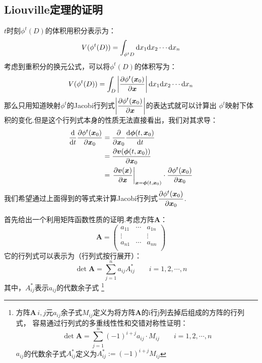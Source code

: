     \subsection{Liouville定理的证明}
    $t$时刻$\phi^t(D)$的体积用积分表示为：
    \begin{equation}
        V(\phi^t(D)) = \int_{\phi^t D}\mathrm{d} x_1\mathrm{d} x_2\cdots\mathrm{d} x_n
    \end{equation}
    考虑到重积分的换元公式，可以将$\phi^t(D)$的体积写为：
    \begin{equation}
        V(\phi^t(D)) = \int_{D}\left|\frac{\partial{\phi^t(\bm{x}_0)}}{\partial{\bm{x}}}\right|\mathrm{d} x_1\mathrm{d} x_2\cdots\mathrm{d} x_n
        \label{volum of D}
    \end{equation}
    那么只用知道映射$\phi^t$的Jacobi行列式$\displaystyle\left|\frac{\partial{\phi^t(\bm{x}_0)}}{\partial{\bm{x}}}\right|$的表达式就可以计算出
    $\phi^t$映射下体积的变化.但是这个行列式本身的性质无法直接看出，我们对其求导：
    \begin{equation}
        \begin{split}
            \frac{\mathrm{d}{}}{\mathrm{d}{t}}\frac{\partial{\phi^t(\bm{x}_0)}}{\partial{\bm{x}_0}} &= \frac{\partial{}}{\partial{\bm{x}_0}}\frac{\mathrm{d}{\bm{\phi}(t, \bm{x}_0)}}{\mathrm{d}{t}}\\
            & = \frac{\partial{\bm{v}(\bm{\phi}(t, \bm{x}_0))}}{\partial{\bm{x}_0}}\\
            & = \left.\frac{\partial{\bm{v}(\bm{x})}}{\partial{\bm{x}}}\right|_{\bm{x}=\bm{\phi}(t, \bm{x}_0)}\cdot
            \frac{\partial{\phi^t(\bm{x}_0)}}{\partial{\bm{x}_0}}
        \end{split}
        \label{the equation of jacobian}
    \end{equation}
    我们希望通过上面得到的等式来计算Jacobi行列式$\displaystyle\frac{\partial{\phi^t(\bm{x}_0)}}{\partial{\bm{x}_0}}$.
    \par 
    首先给出一个利用矩阵函数性质的证明.考虑方阵$\bm{A}$：
    \begin{equation}
        \bm{A} = 
        \begin{pmatrix}
            a_{11} & \cdots & a_{1n}\\
            \vdots & & \vdots\\
            a_{n1} & \cdots & a_{nn}\\
        \end{pmatrix}
    \end{equation}
    它的行列式可以表示为（行列式按行展开）：
    \begin{equation}
        \det{\bm{A}} = \sum_{j=1}^na_{ij} A_{ij}^* \quad\quad i = 1, 2, \cdots, n
    \end{equation}
    其中，$A_{ij}^*$表示$a_{ij}$的代数余子式
    \footnote{方阵$\bm{A}\,$$i,j$元$a_{ij}$余子式$M_{ij}$定义为将方阵$\bm{A}$的i行j列去掉后组成的方阵的行列式，
    容易通过行列式的多重线性性和交错对称性证明：
    \begin{equation}
        \det \bm{A} = \sum_{j = 1}^{n}(-1)^{i + j}a_{ij}\cdot M_{ij}\quad \quad i = 1, 2, \cdots, n
    \end{equation}
    $a_{ij}$的代数余子式$A_{ij}^*$定义为$A_{ij}^* := (-1)^{i+j}M_{ij}$
    }
